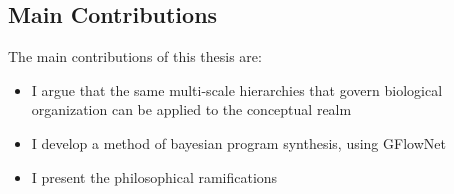 


\subsection{Main Contributions}
The main contributions of this thesis are: 
\begin{itemize}
    \item I argue that the same multi-scale hierarchies that govern biological organization can be applied to the conceptual realm
    \item I develop a method of bayesian program synthesis, using GFlowNet
    \item I present the philosophical ramifications
\end{itemize}